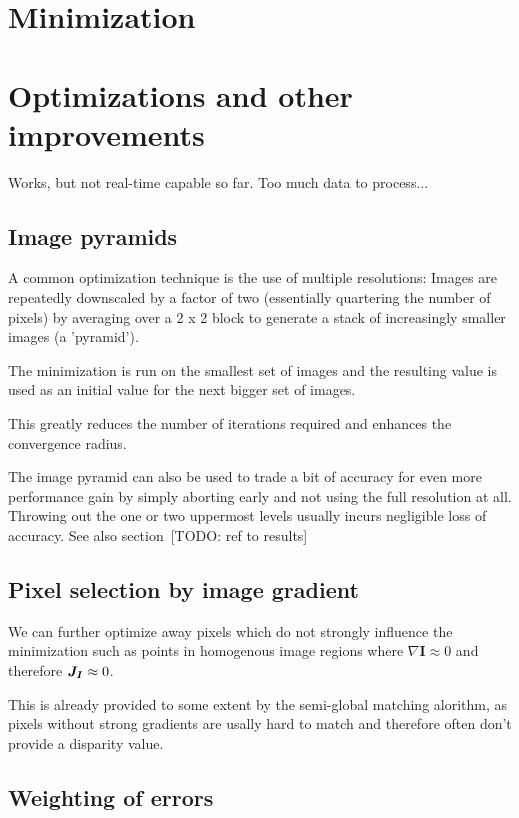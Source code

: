 \section{Minimization}



\section{Optimizations and other improvements}
\label{sec:optimizations}

Works, but not real-time capable so far. Too much data to process...

\subsection{Image pyramids}

A common optimization technique is the use of multiple resolutions: Images are
repeatedly downscaled by a factor of two (essentially quartering the number of
pixels) by averaging over a 2 x 2 block to generate a stack of increasingly
smaller images (a 'pyramid').

The minimization is run on the smallest set of images and the resulting value
is used as an initial value for the next bigger set of images.

This greatly reduces the number of iterations required and enhances the
convergence radius.

The image pyramid can also be used to trade a bit of accuracy for even more
performance gain by simply aborting early and not using the full resolution at
all. Throwing out the one or two uppermost levels usually incurs negligible
loss of accuracy. See also section~[TODO: ref to results] 


\subsection{Pixel selection by image gradient}
\label{subsec:gradient_filtering}

We can further optimize away pixels which do not strongly influence the
minimization such as points in homogenous image regions where $\nabla
\mathbf{I} \approx 0$ and therefore $\mat{J_I} \approx 0$.

This is already provided to some extent by the semi-global matching alorithm,
as pixels without strong gradients are usally hard to match and therefore often
don't provide a disparity value.

\subsection{Weighting of errors}

